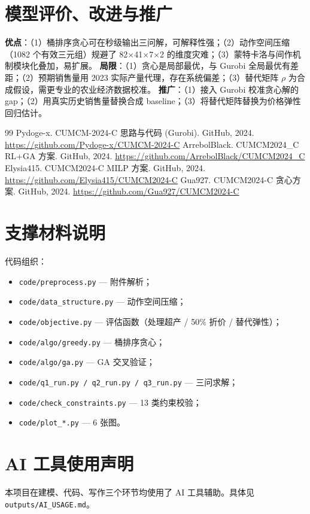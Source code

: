 \documentclass[UTF8,a4paper,12pt]{ctexart}
\begin{document}
\section{模型评价、改进与推广}
\textbf{优点}：（1）桶排序贪心可在秒级输出三问解，可解释性强；（2）动作空间压缩（1082 个有效三元组）规避了 82$\times$41$\times$7$\times$2 的维度灾难；（3）蒙特卡洛与间作机制模块化叠加，易扩展。
\textbf{局限}：（1）贪心是局部最优，与 Gurobi 全局最优有差距；（2）预期销售量用 2023 实际产量代理，存在系统偏差；（3）替代矩阵 $\rho$ 为合成假设，需更专业的农业经济数据校准。
\textbf{推广}：（1）接入 Gurobi 校准贪心解的 gap；（2）用真实历史销售量替换合成 baseline；（3）将替代矩阵替换为价格弹性回归估计。

\begin{thebibliography}{99}
 Pydoge-x. CUMCM-2024-C 思路与代码 (Gurobi). GitHub, 2024. \url{https://github.com/Pydoge-x/CUMCM-2024-C}
 ArrebolBlack. CUMCM2024\_C RL+GA 方案. GitHub, 2024. \url{https://github.com/ArrebolBlack/CUMCM2024_C}
 Elysia415. CUMCM2024-C MILP 方案. GitHub, 2024. \url{https://github.com/Elysia415/CUMCM2024-C}
 Gua927. CUMCM2024-C 贪心方案. GitHub, 2024. \url{https://github.com/Gua927/CUMCM2024-C}
\end{thebibliography}

\appendix
\section{支撑材料说明}
代码组织：
\begin{itemize}
  \item \texttt{code/preprocess.py} — 附件解析；
  \item \texttt{code/data\_structure.py} — 动作空间压缩；
  \item \texttt{code/objective.py} — 评估函数（处理超产 / 50\% 折价 / 替代弹性）；
  \item \texttt{code/algo/greedy.py} — 桶排序贪心；
  \item \texttt{code/algo/ga.py} — GA 交叉验证；
  \item \texttt{code/q1\_run.py / q2\_run.py / q3\_run.py} — 三问求解；
  \item \texttt{code/check\_constraints.py} — 13 类约束校验；
  \item \texttt{code/plot\_*.py} — 6 张图。
\end{itemize}

\section{AI 工具使用声明}
本项目在建模、代码、写作三个环节均使用了 AI 工具辅助。具体见 \texttt{outputs/AI\_USAGE.md}。
\end{document}
